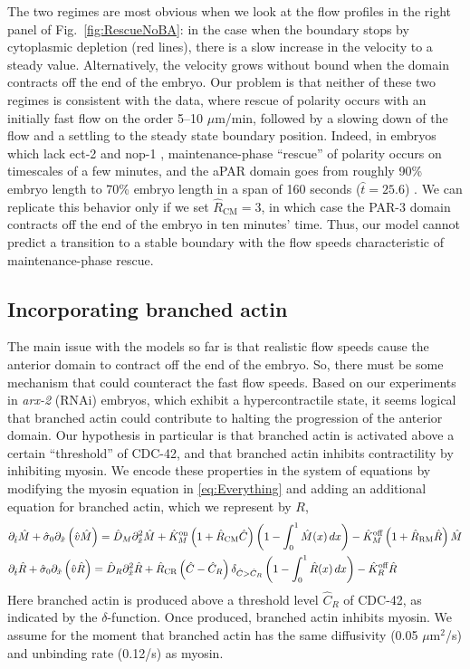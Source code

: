 \documentclass[11pt]{article}
\newcommand{\red}[1]{\color{red}#1\normalcolor}
\newcommand{\6}[1]{#1_{\text{6}}}
\newcommand{\3}[1]{#1_{\text{3}}}
\begin{document}
The two regimes are most obvious when we look at the flow profiles in the right panel of Fig.\ \ref{fig:RescueNoBA}: in the case when the boundary stops by cytoplasmic depletion (red lines), there is a slow increase in the velocity to a steady value. Alternatively, the velocity grows without bound when the domain contracts off the end of the embryo. Our problem is that neither of these two regimes is consistent with the data, where rescue of polarity occurs with an initially fast flow on the order 5--10 $\mu$m/min, followed by a slowing down of the flow and a settling to the steady state boundary position. Indeed, in embryos which lack ect-2 and nop-1 \cite{tse2012rhoa}, maintenance-phase ``rescue'' of polarity occurs on timescales of a few minutes, and the aPAR domain goes from roughly 90\% embryo length to 70\% embryo length in a span of 160 seconds ($\hat t = 25.6$) \cite[Fig.~7D]{tse2012rhoa}. We can replicate this behavior only if we set $\hat R_\text{CM}=3$, in which case the PAR-3 domain contracts off the end of the embryo in ten minutes' time. Thus, our model cannot predict a transition to a stable boundary with the flow speeds characteristic of maintenance-phase rescue. 


\subsection{Incorporating branched actin}
The main issue with the models so far is that realistic flow speeds cause the anterior domain to contract off the end of the embryo. So, there must be some mechanism that could counteract the fast flow speeds. Based on our experiments in \emph{arx-2} (RNAi) embryos, which exhibit a hypercontractile state, it seems logical that branched actin could contribute to halting the progression of the anterior domain. Our hypothesis in particular is that branched actin is activated above a certain ``threshold'' of CDC-42, and that branched actin inhibits contractility by inhibiting myosin. We encode these properties in the system of equations by modifying the myosin equation in \eqref{eq:Everything} and adding an additional equation for branched actin, which we represent by $R$,  
\begin{align}
\nonumber
&\partial_{\hat{t}} \hat{M} +\hat{\sigma}_0  \partial_{\hat{x}} \left(\hat{v} \hat{M} \right) =\hat{D}_M \partial_{\hat{x}}^2 \hat{M} +\hat{K}^\text{on}_M \left(1+\hat{R}_\text{CM} \hat C\right) \left(1-\int_0^1  \hat{M}(x) \, dx\right)- \hat{K}^\text{off}_M \left(1+\hat R_\text{RM} \hat R\right) \hat{M}\\
\label{eq:BAll}
&\partial_{\hat{t}} \hat{R} +\hat{\sigma}_0  \partial_{\hat{x}} \left(\hat{v} \hat{R} \right) =\hat{D}_R \partial_{\hat{x}}^2 \hat{R} +\hat R_\text{CR} \left(\hat C-\hat C_R\right) {\delta}_{\hat C > \hat C_R} \left(1-\int_0^1  \hat{R}(x) \, dx\right)- \hat{K}^\text{off}_R \hat{R}
\end{align}
Here branched actin is produced above a threshold level $\hat C_R$ of CDC-42, as indicated by the $\delta$-function. Once produced, branched actin inhibits myosin. \red{We assume for the moment that branched actin has the same diffusivity (0.05 $\mu$m$^2$/s) and unbinding rate (0.12/s) as myosin.}
\end{document}
